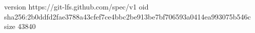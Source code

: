 version https://git-lfs.github.com/spec/v1
oid sha256:2b0ddfd2fae3788a43cfef7ce4bbc2be913be7bf706593a0414ea993075b546c
size 43840
